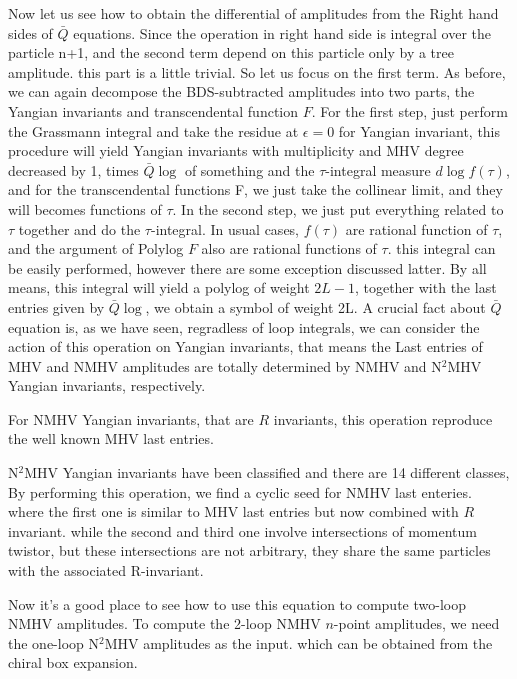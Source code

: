 \documentclass[a4paper,11pt]{article}
\begin{document}
Now let us see how to obtain the differential of amplitudes from the Right hand sides of $\bar{Q}$ equations. Since the operation in right hand side is integral over the particle n+1, and the second term depend on this particle only by a tree amplitude. this part is a little trivial. So let us focus on the first term. As before, we can again decompose the BDS-subtracted amplitudes into two parts, the Yangian invariants and transcendental function $F$. For the first step, just perform the Grassmann integral and take the residue at $\epsilon=0$  for Yangian invariant, this procedure will yield Yangian invariants with multiplicity and MHV degree decreased by 1, times $\bar{Q}\log$ of something and the $\tau$-integral measure $d\log f(\tau)$,  and for the transcendental functions F, we just take the collinear limit, and they will becomes functions of $\tau$. In the second step, we just put everything related to $\tau$ together and do the $\tau$-integral. In usual cases, $f(\tau)$ are rational function of $\tau$, and the argument of Polylog $F$ also are rational functions of $\tau$. this integral can be easily performed, however there are some exception discussed latter. By all means, this integral will yield a polylog of weight $2L-1$, together with the last entries given by $\bar{Q}\log$, we obtain a symbol of weight 2L. A crucial fact about $\bar{Q}$ equation is, as we have seen, regradless of loop integrals, we can consider the action of this operation on Yangian invariants, that means the Last entries of MHV and NMHV amplitudes are totally determined by NMHV and N$^{2}$MHV Yangian invariants, respectively.  



For NMHV Yangian invariants, that are $R$ invariants, this operation reproduce the well known MHV last entries. 

N$^{2}$MHV Yangian invariants have been classified and there are 14 different classes, 
By performing this operation, we find a cyclic seed for NMHV last enteries. where the first one is similar to MHV last entries but now combined with $R$ invariant. while the second and third one involve intersections of momentum twistor, 
but these intersections are not arbitrary, they share the same particles with the associated R-invariant. 



Now it's a good place to see how to use this equation to compute two-loop NMHV amplitudes. To compute the 2-loop NMHV $n$-point amplitudes, we need  the one-loop N$^{2}$MHV amplitudes as the input. which can be obtained from the chiral box expansion. 
\end{document}

